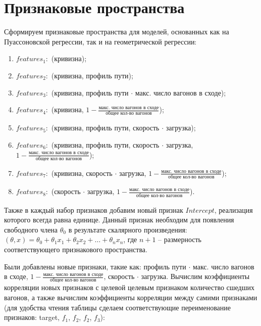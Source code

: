 \section{Признаковые пространства}

Сформируем признаковые пространства для моделей, основанных как на Пуассоновской регрессии, так и на геометрической регрессии:

\begin{enumerate}[label=\arabic*.]
    \item $features_1:$ (кривизна);
    \item $features_2:$ (кривизна, профиль пути);
    \item $features_3:$ (кривизна, профиль пути $\cdot$ макс. число вагонов в сходе);
    \item $features_4:$ (кривизна, $1 - \frac{\text{макс. число вагонов в сходе}}{\text{общее кол-во вагонов}}$);
    \item $features_5:$ (кривизна, профиль пути, скорость $\cdot$ загрузка);
    \item $features_6:$ (кривизна, профиль пути, скорость $\cdot$ загрузка,\\ $1 - \frac{\text{макс. число вагонов в сходе}}{\text{общее кол-во вагонов}}$);
    \item $features_7:$ (кривизна, скорость $\cdot$ загрузка, $1 - \frac{\text{макс. число вагонов в сходе}}{\text{общее кол-во вагонов}}$);
    \item $features_8:$ (скорость $\cdot$ загрузка, $1 - \frac{\text{макс. число вагонов в сходе}}{\text{общее кол-во вагонов}}$).
    \newline
\end{enumerate}
Также в каждый набор признаков добавим новый признак $Intercept$, реализация которого всегда равна единице. Данный признак необходим для появления свободного члена $\theta_0$ в результате скалярного произведения: $(\theta, x) = \theta_0 + \theta_1 x_1 + \theta_2 x_2 + \ldots + \theta_n x_n$, где $n+1$ -- размерность соответствующего признакового пространства.

Были добавлены новые признаки, такие как: профиль пути $\cdot$ макс. число вагонов в сходе, $1 - \frac{\text{макс. число вагонов в сходе}}{\text{общее кол-во вагонов}}$, скорость $\cdot$ загрузка. Вычислим коэффициенты корреляции новых признаков с целевой целевым признаком количество сшедших вагонов, а также вычислим коэффициенты корреляции между самими признаками (для удобства чтения таблицы сделаем соответствующие переименование признаков: target, $f_1$, $f_2$, $f_2$, $f_3$):

